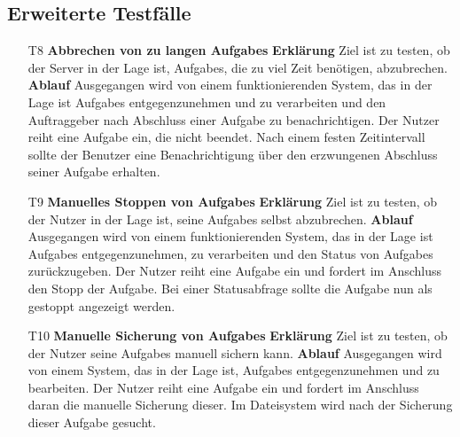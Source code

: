 \documentclass[a4paper,12pt]{article}
\begin{document}
\subsection{Erweiterte Testfälle}

\begin{itemize}

\item[T8] \textbf{Abbrechen von zu langen \glspl{Aufgabe} }
\subitem \textbf{Erklärung} Ziel ist zu testen, ob der \gls{Server} in der Lage ist, \glspl{Aufgabe}, die zu viel Zeit benötigen, abzubrechen.
\subitem \textbf{Ablauf} Ausgegangen wird von einem funktionierenden System, das in der Lage ist \glspl{Aufgabe} entgegenzunehmen und zu verarbeiten und den Auftraggeber nach Abschluss einer \gls{Aufgabe} zu benachrichtigen.
Der Nutzer reiht eine \gls{Aufgabe} ein, die nicht beendet. Nach einem festen Zeitintervall sollte der \gls{Benutzer} eine Benachrichtigung über den erzwungenen Abschluss seiner \gls{Aufgabe} erhalten.

\item[T9] \textbf{Manuelles Stoppen von \glspl{Aufgabe} }
\subitem \textbf{Erklärung} Ziel ist zu testen, ob der Nutzer in der Lage ist, seine \glspl{Aufgabe} selbst abzubrechen.
\subitem \textbf{Ablauf} Ausgegangen wird von einem funktionierenden System, das in der Lage ist \glspl{Aufgabe} entgegenzunehmen, zu verarbeiten und den Status von \glspl{Aufgabe} zurückzugeben.
Der Nutzer reiht eine \gls{Aufgabe} ein und fordert im Anschluss den Stopp der \gls{Aufgabe}. Bei einer Statusabfrage sollte die \gls{Aufgabe} nun als gestoppt angezeigt werden.

\item[T10] \textbf{Manuelle Sicherung von \glspl{Aufgabe}}
\subitem \textbf{Erklärung} Ziel ist zu testen, ob der Nutzer seine \glspl{Aufgabe} manuell sichern kann.
\subitem \textbf{Ablauf} Ausgegangen wird von einem System, das in der Lage ist, \glspl{Aufgabe} entgegenzunehmen und zu bearbeiten.
Der Nutzer reiht eine \gls{Aufgabe} ein und fordert im Anschluss daran die manuelle Sicherung dieser. Im Dateisystem wird nach der Sicherung dieser \gls{Aufgabe} gesucht.

\end{itemize}

\clearpage
\printnoidxglossaries
\end{document}

